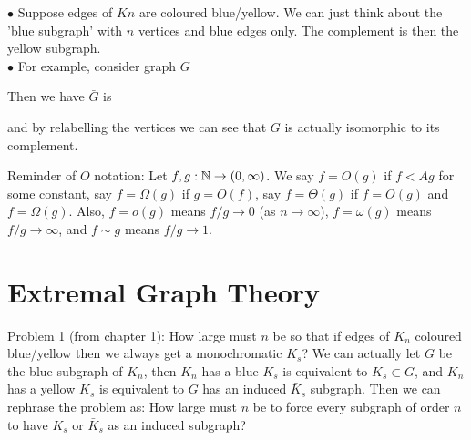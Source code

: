 \documentclass[a4paper]{article}
\begin{document}
\begin{eg}
$\bullet$ Suppose edges of $Kn$ are coloured blue/yellow. We can just think about the 'blue subgraph' with $n$ vertices and blue edges only. The complement is then the yellow subgraph.\\
$\bullet$ For example, consider graph $G$


Then we have $\bar{G}$ is


and by relabelling the vertices we can see that $G$ is actually isomorphic to its complement.

\end{eg}

Reminder of $O$ notation: Let $f,g: \mathbb{N} \to (0,\infty)$. We say $f = O(g)$ if $f<Ag$ for some constant, say $f=\Omega(g)$ if $g=O(f)$, say $f=\Theta(g)$ if $f=O(g)$ and $f=\Omega(g)$. Also, $f=o(g)$ means $f/g \to 0$ (as $n \to \infty$), $f=\omega(g)$ means $f/g \to \infty$, and $f \sim g$ means $f/g \to 1$.

\newpage

\section{Extremal Graph Theory}
Problem 1 (from chapter 1): How large must $n$ be so that if edges of $K_n$ coloured blue/yellow then we always get a monochromatic $K_s$? We can actually let $G$ be the blue subgraph of $K_n$, then $K_n$ has a blue $K_s$ is equivalent to $K_s \subset G$, and $K_n$ has a yellow $K_s$ is equivalent to $G$ has an induced $\bar{K}_s$ subgraph. Then we can rephrase the problem as: How large must $n$ be to force every subgraph of order $n$ to have $K_s$ or $\bar{K}_s$ as an induced subgraph?
\end{document}
